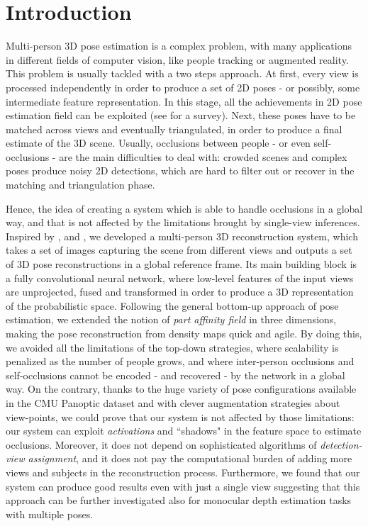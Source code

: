 \documentclass[a4paper,conference]{IEEEtran}
\begin{document}
\section{Introduction}

Multi-person 3D pose estimation is a complex problem, with many applications in different fields of computer vision, like people tracking or augmented reality. This problem is usually tackled with a two steps approach. At first, every view is processed independently in order to produce a set of 2D poses - or possibly, some intermediate feature representation. In this stage, all the achievements in 2D pose estimation field can be exploited (see \cite{dang2019deep} for a survey). Next, these poses have to be matched across views and eventually triangulated, in order to produce a final estimate of the 3D scene. Usually, occlusions between people - or even self-occlusions - are the main difficulties to deal with: crowded scenes and complex poses produce noisy 2D detections, which are hard to filter out or recover in the matching and triangulation phase.

Hence, the idea of creating a system which is able to handle occlusions in a global way, and that is not affected by the limitations brought by single-view inferences. Inspired by \cite{iskakov2019learnable}, \cite{joo2015panoptic} and \cite{cao2017realtime}, we developed a multi-person 3D reconstruction system, which takes a set of images capturing the scene from different views and outputs a set of 3D pose reconstructions in a global reference frame. Its main building block is a fully convolutional neural network, where low-level features of the input views are unprojected, fused and transformed in order to produce a 3D representation of the probabilistic space. Following the general bottom-up approach of pose estimation, we extended the notion of \textit{part affinity field} in three dimensions, making the pose reconstruction from density maps quick and agile. By doing this, we avoided all the limitations of the top-down strategies, where scalability is penalized as the number of people grows, and where inter-person occlusions and self-occlusions cannot be encoded - and recovered - by the network in a global way. On the contrary, thanks to the huge variety of pose configurations available in the CMU Panoptic dataset and with clever augmentation strategies about view-points, we could prove that our system is not affected by those limitations: our system can exploit \textit{activations} and ``shadows" in the feature space to estimate occlusions. Moreover, it does not depend on sophisticated algorithms of \textit{detection-view assignment}, and it does not pay the computational burden of adding more views and subjects in the reconstruction process. Furthermore, we found that our system can produce good results even with just a single view suggesting that this approach can be further investigated also for monocular depth estimation tasks with multiple poses.
\end{document}
